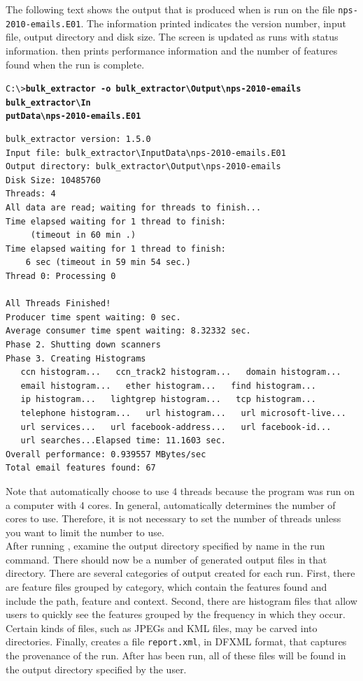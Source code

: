 \documentclass[11pt]{article} %
\begin{document}
The following text shows the output that is produced when \bulk is run on the file \texttt{nps-2010-emails.E01}. The information printed indicates the version number, input file, output directory and disk size. The screen is updated as \bulk runs  with status information. \bulk then prints performance information and the number of features found when the run is complete.

\begingroup
\footnotesize
\texttt{C:\textbackslash \textgreater \textbf{bulk\_extractor -o bulk\_extractor\textbackslash Output\textbackslash nps-2010-emails bulk\_extractor\textbackslash In\\putData\textbackslash nps-2010-emails.E01}}
\endgroup
\begingroup
\footnotesize
\begin{Verbatim}[fontfamily=courier]
bulk_extractor version: 1.5.0
Input file: bulk_extractor\InputData\nps-2010-emails.E01
Output directory: bulk_extractor\Output\nps-2010-emails
Disk Size: 10485760
Threads: 4
All data are read; waiting for threads to finish...
Time elapsed waiting for 1 thread to finish:
     (timeout in 60 min .)
Time elapsed waiting for 1 thread to finish:
    6 sec (timeout in 59 min 54 sec.)
Thread 0: Processing 0

All Threads Finished!
Producer time spent waiting: 0 sec.
Average consumer time spent waiting: 8.32332 sec.
Phase 2. Shutting down scanners
Phase 3. Creating Histograms
   ccn histogram...   ccn_track2 histogram...   domain histogram...
   email histogram...   ether histogram...   find histogram...
   ip histogram...   lightgrep histogram...   tcp histogram...
   telephone histogram...   url histogram...   url microsoft-live...
   url services...   url facebook-address...   url facebook-id...
   url searches...Elapsed time: 11.1603 sec.
Overall performance: 0.939557 MBytes/sec
Total email features found: 67
\end{Verbatim}
\endgroup

Note that \bulk automatically choose to use 4 threads because the program was run on a computer with 4 cores. In general, \bulk automatically determines the number of cores to use. Therefore, it is not necessary to set the number of threads unless you want to limit the number to use.\\

After running \bulk, examine the output directory specified by name in the run command. There should now be a number of generated output files in that directory. There are several categories of output created for each \bulk run. First, there are feature files grouped by category, which contain the features found and include the path, feature and context. Second, there are histogram files that allow users to quickly see the features grouped by the frequency in which they occur. Certain kinds of files, such as JPEGs and KML files, may be carved into directories. Finally, \bulk creates a file \texttt{report.xml}, in DFXML format, that captures the provenance of the run. After \bulk has been run, all of these files will be found in the output directory specified by the user.\\
\end{document}
